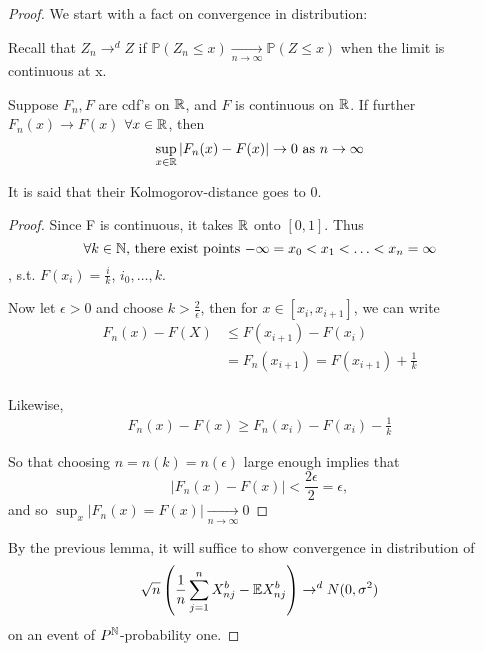 \documentclass[a4paper]{article}
\begin{document}
\begin{proof} 
	We start with a fact on convergence in distribution:
	
	Recall that $Z_n \to ^{d} Z$ if $\mathbb{P}\left( Z_n \le x \right) \underset{n\to \infty}{\to } \mathbb{P}\left( Z \le x \right)$ when the limit is continuous at x. 

	\begin{lemma}
		Suppose $F_n, F$ are cdf's on $\mathbb{R}$, and $F$ is continuous on $\mathbb{R}$. If further  $F_n(x) \to F(x)$ $\forall x \in \mathbb{R}$, then 
		\[
			\sup_{x \in \mathbb{R}} |F_n(x) - F(x)| \to 0 \text{ as } n\to \infty
		\]

		It is said that their Kolmogorov-distance goes to $0$.
	\end{lemma}

	\begin{proof}
		Since F is continuous, it takes $\mathbb{R}$ onto $[0,1]$. Thus 
		\[
			\forall k \in \N$, there exist points $-\infty = x_0 < x_1 < \ldots < x_n = \infty
		\], s.t. $F(x_i) = \frac{i}{k}$, $i_0,\ldots,k$.

		Now let $\epsilon > 0$ and choose $k > \frac{2}{\epsilon}$, then for $x \in [x_i, x_{i+1}]$, we can write
		\begin{align*}
			F_n(x) - F(X) &\le  F(x_{i+1}) - F(x_i) \\
				      &= F_n(x_{i+1}) = F(x_{i+1}) + \frac{1}{k} \\
		\end{align*}
		
		Likewise,
		\begin{align*}
			F_n(x) - F(x) \ge F_n(x_i) - F(x_i) - \frac{1}{k}
		\end{align*}

		So that choosing $n = n(k) = n(\epsilon)$ large enough implies that
		\[
			|F_n(x) - F(x)| < \frac{2\epsilon}{2} = \epsilon
		,\]
		and so $\sup_x |F_n(x) = F(x)| \underset{n\to \infty}{\to } 0$

	\end{proof}

	By the previous lemma, it will suffice to show convergence in distribution of 
	 \[
		 \sqrt{n}\left( \frac{1}{n} \sum_{j=1}^{n} X_{nj}^{b} - \mathbb{E} X_{nj}^{b} \right) \to ^{d} N(0, \sigma^2)  
	\]
	on an event of $P^{\mathbb{N}}$-probability one. 
\end{proof}
\end{document}
